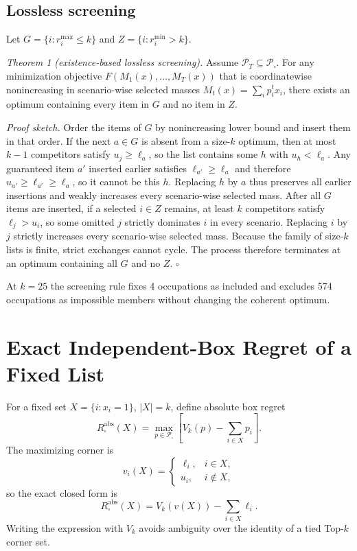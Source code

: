 \documentclass[conference]{IEEEtran}
\begin{document}
\subsection{Lossless screening}
Let $G=\{i:r_i^{\max}\le k\}$ and $Z=\{i:r_i^{\min}>k\}$.

\textit{Theorem 1 (existence-based lossless screening).} Assume $\mathcal P_T\subseteq\mathcal P_{\square}$. For any minimization objective $F(M_1(x),\ldots,M_T(x))$ that is coordinatewise nonincreasing in scenario-wise selected masses $M_t(x)=\sum_i p_i^t x_i$, there exists an optimum containing every item in $G$ and no item in $Z$.

\textit{Proof sketch.} Order the items of $G$ by nonincreasing lower bound and insert them in that order. If the next $a\in G$ is absent from a size-$k$ optimum, then at most $k-1$ competitors satisfy $u_j\ge\ell_a$, so the list contains some $h$ with $u_h<\ell_a$. Any guaranteed item $a'$ inserted earlier satisfies $\ell_{a'}\ge\ell_a$ and therefore $u_{a'}\ge\ell_{a'}\ge\ell_a$, so it cannot be this $h$. Replacing $h$ by $a$ thus preserves all earlier insertions and weakly increases every scenario-wise selected mass. After all $G$ items are inserted, if a selected $i\in Z$ remains, at least $k$ competitors satisfy $\ell_j>u_i$, so some omitted $j$ strictly dominates $i$ in every scenario. Replacing $i$ by $j$ strictly increases every scenario-wise selected mass. Because the family of size-$k$ lists is finite, strict exchanges cannot cycle. The process therefore terminates at an optimum containing all $G$ and no $Z$. $\square$

At $k=25$ the screening rule fixes 4 occupations as included and excludes 574 occupations as impossible members without changing the coherent optimum.

\section{Exact Independent-Box Regret of a Fixed List}
For a fixed set $X=\{i:x_i=1\}$, $|X|=k$, define absolute box regret
\begin{equation}
R_{\square}^{\mathrm{abs}}(X)=\max_{p\in\mathcal P_{\square}}\left[V_k(p)-\sum_{i\in X}p_i\right].
\end{equation}
The maximizing corner is
\begin{equation}
v_i(X)=\begin{cases}\ell_i,&i\in X,\\u_i,&i\notin X,\end{cases}
\end{equation}
so the exact closed form is
\begin{equation}
R_{\square}^{\mathrm{abs}}(X)=V_k(v(X))-\sum_{i\in X}\ell_i.
\label{eq:boxregret}
\end{equation}
Writing the expression with $V_k$ avoids ambiguity over the identity of a tied Top-$k$ corner set.
\end{document}
